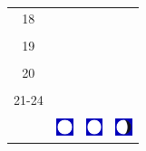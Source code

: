 \documentclass[a4paper,12pt, tikz]{scrartcl}
\begin{document}
\begin{tabularx}{\linewidth}{|c|X|X|X|}
      \hline
      18&   &       &    \\
        &   &       &    \\
      \hline
      19&   &       &    \\
        &   &       &    \\
      \hline
      20&   &       &    \\
        &   &       &    \\
      \hline
      21-24&   &       &    \\
        &   &       &    \\
      \hline  
      & \vspace{0.01cm} \centerline{\includegraphics[width=0.5cm]{moon_phases/Moon_phase_4.svg.png}} \vspace{0.1cm} & \vspace{0.01cm} \centerline{\includegraphics[width=0.5cm]{moon_phases/Moon_phase_4.svg.png}} \vspace{0.1cm} & \vspace{0.01cm} \centerline{\includegraphics[width=0.5cm]{moon_phases/Moon_phase_5.svg.png}} \vspace{0.1cm}\\
      \hline   
    \end{tabularx}




    \newpage

        \noindent
\end{document}
